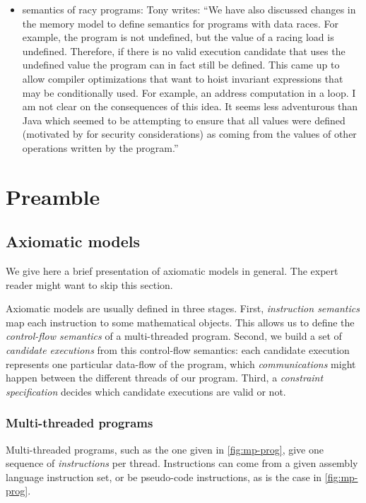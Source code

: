 \documentclass[a4paper]{article}
\begin{document}
{\begin{itemize}
\item semantics of racy programs: Tony writes: ``We have also discussed changes
in the memory model to define semantics for programs with data races. For
example, the program is not undefined, but the value of a racing load is
undefined. Therefore, if there is no valid execution candidate that uses the
undefined value the program can in fact still be defined. This came up to allow
compiler optimizations that want to hoist invariant expressions that may be
conditionally used. For example, an address computation in a loop. I am not
clear on the consequences of this idea. It seems less adventurous than Java
which seemed to be attempting to ensure that all values were defined
(motivated by for security considerations) as coming from the values of other
operations written by the program.''
\end{itemize} 

}

\clearpage

\section{Preamble \label{sec:preamble}}

\subsection{Axiomatic models}

We give here a brief presentation of axiomatic models in general. The expert
reader might want to skip this section.

Axiomatic models are usually defined in three stages. First, \emph{instruction
semantics} map each instruction to some mathematical objects. This allows us to
define the \emph{control-flow semantics} of a multi-threaded program.  Second,
we build a set of \emph{candidate executions} from this control-flow semantics:
each candidate execution represents one particular data-flow of the program,
\ie which \emph{communications} might happen between the different threads of
our program. Third, a \emph{constraint specification} decides which candidate
executions are valid or not.

\subsubsection{Multi-threaded programs}

Multi-threaded programs, such as the one given in \myfig\ref{fig:mp-prog}, give
one sequence of \emph{instructions} per thread.  Instructions can come from a
given assembly language instruction set, or be pseudo-code instructions, as is
the case in \myfig\ref{fig:mp-prog}.
\end{document}
